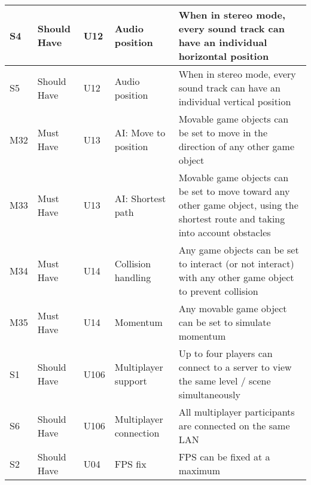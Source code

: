 \documentclass{article} %
\begin{document}
\begin{longtable}{|p{}|p{}|p{}|p{}|p{}|}
    S4                          & Should Have                        & U12                & Audio position              & When in stereo mode, every sound track can have an individual horizontal position                                                                           \\ \hline
    S5                          & Should Have                        & U12                & Audio position              & When in stereo mode, every sound track can have an individual vertical position                                                                             \\ \hline
    M32                         & Must Have                          & U13                & AI: Move to position        & Movable game objects can be set to move in the direction of any other game object                                                                           \\ \hline
    M33                         & Must Have                          & U13                & AI: Shortest path           & Movable game objects can be set to move toward any other game object, using the shortest route and taking into account obstacles                            \\ \hline
    M34                         & Must Have                          & U14                & Collision handling          & Any game objects can be set to interact (or not interact) with any other game object to prevent collision                                                   \\ \hline
    M35                         & Must Have                          & U14                & Momentum                    & Any movable game object can be set to simulate momentum                                                                                                     \\ \hline
    S1                          & Should Have                        & U106               & Multiplayer support         & Up to four players can connect to a server to view the same level / scene simultaneously                                                                    \\ \hline
    S6                          & Should Have                        & U106               & Multiplayer connection      & All multiplayer participants are connected on the same LAN                                                                                                  \\ \hline
    S2                          & Should Have                        & U04                & FPS fix                     & FPS can be fixed at a maximum                                                                                                                               \\ \hline
\end{longtable}
\newpage
\end{document}
